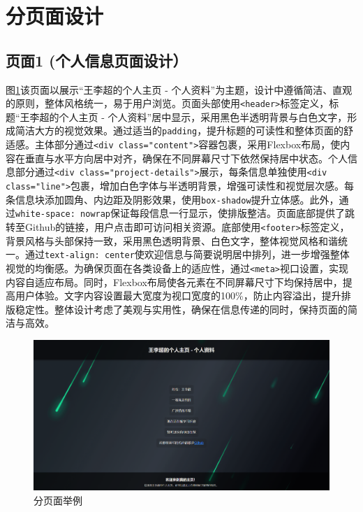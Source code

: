 \documentclass[supercite]{Experimental_Report}
\theoremstyle{definition}
\begin{document}
\newpage

\section{分页面设计}

\subsection{页面1 (个人信息页面设计）}

图\ref{fig3-1}该页面以展示“王李超的个人主页 - 个人资料”为主题，设计中遵循简洁、直观的原则，整体风格统一，易于用户浏览。页面头部使用\texttt{<header>}标签定义，标题“王李超的个人主页 - 个人资料”居中显示，采用黑色半透明背景与白色文字，形成简洁大方的视觉效果。通过适当的\texttt{padding}，提升标题的可读性和整体页面的舒适感。主体部分通过\texttt{<div class="content">}容器包裹，采用Flexbox布局，使内容在垂直与水平方向居中对齐，确保在不同屏幕尺寸下依然保持居中状态。个人信息部分通过\texttt{<div class="project-details">}展示，每条信息单独使用\texttt{<div class="line">}包裹，增加白色字体与半透明背景，增强可读性和视觉层次感。每条信息块添加圆角、内边距及阴影效果，使用\texttt{box-shadow}提升立体感。此外，通过\texttt{white-space: nowrap}保证每段信息一行显示，使排版整洁。页面底部提供了跳转至Github的链接，用户点击即可访问相关资源。底部使用\texttt{<footer>}标签定义，背景风格与头部保持一致，采用黑色透明背景、白色文字，整体视觉风格和谐统一。通过\texttt{text-align: center}使欢迎信息与简要说明居中排列，进一步增强整体视觉的均衡感。为确保页面在各类设备上的适应性，通过\texttt{<meta>}视口设置，实现内容自适应布局。同时，Flexbox布局使各元素在不同屏幕尺寸下均保持居中，提高用户体验。文字内容设置最大宽度为视口宽度的100\%，防止内容溢出，提升排版稳定性。整体设计考虑了美观与实用性，确保在信息传递的同时，保持页面的简洁与高效。

\begin{figure}[htb]
	\begin{center}
		\includegraphics[scale=0.20]{images/3-1.png}
		\caption{分页面举例}
		\label{fig3-1}
	\end{center}
\end{figure}
\end{document}
